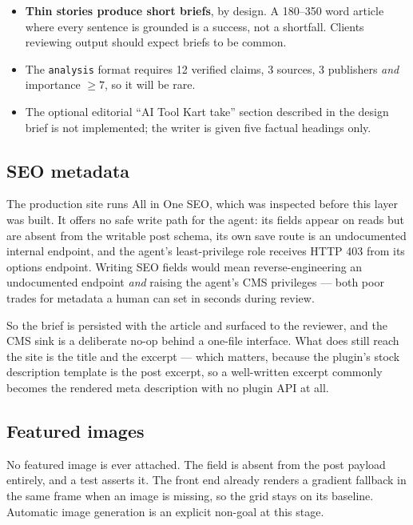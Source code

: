 \documentclass[11pt,a4paper]{article}
\newcommand{\brk}{\hyphenpenalty=0\exhyphenpenalty=0\relax}
\newcommand{\code}[1]{\texttt{\small\brk #1}}
\begin{document}
\begin{itemize}[leftmargin=1.2em,itemsep=0.25em]
  \item \textbf{Thin stories produce short briefs}, by design. A 180--350 word
    article where every sentence is grounded is a success, not a shortfall. Clients
    reviewing output should expect briefs to be common.
  \item The \code{analysis} format requires 12 verified claims, 3 sources, 3
    publishers \emph{and} importance $\geq 7$, so it will be rare.
  \item The optional editorial ``AI Tool Kart take'' section described in the design
    brief is not implemented; the writer is given five factual headings only.
\end{itemize}

\subsection{SEO metadata}

\begin{holdbox}
The production site runs All in One SEO, which was inspected before this layer was
built. It offers no safe write path for the agent: its fields appear on reads but
are absent from the writable post schema, its own save route is an undocumented
internal endpoint, and the agent's least-privilege role receives HTTP 403 from its
options endpoint. Writing SEO fields would mean reverse-engineering an
undocumented endpoint \emph{and} raising the agent's CMS privileges --- both poor
trades for metadata a human can set in seconds during review.

So the brief is persisted with the article and surfaced to the reviewer, and the
CMS sink is a deliberate no-op behind a one-file interface. What does still reach
the site is the title and the excerpt --- which matters, because the plugin's stock
description template is the post excerpt, so a well-written excerpt commonly becomes
the rendered meta description with no plugin API at all.
\end{holdbox}

\subsection{Featured images}

No featured image is ever attached. The field is absent from the post payload
entirely, and a test asserts it. The front end already renders a gradient fallback
in the same frame when an image is missing, so the grid stays on its baseline.
Automatic image generation is an explicit non-goal at this stage.
\end{document}
